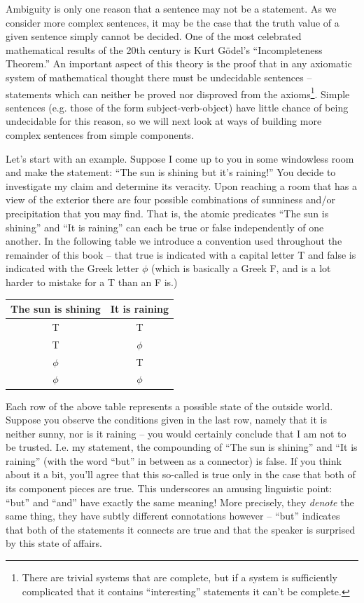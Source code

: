 Ambiguity is only one reason that a sentence may not be a statement.  As 
we consider more complex sentences, it may be the case that the truth
value of a given sentence simply cannot be decided.  One of the most
celebrated mathematical results of the 20th century is 
Kurt G\"{o}del's
``Incompleteness Theorem.''  
An important aspect of this theory is 
the proof that in any axiomatic system of mathematical thought
there must be undecidable sentences -- statements which can neither be proved
nor disproved from the axioms\footnote{There are trivial systems that %
are complete, but if a system is sufficiently complicated that it contains %
``interesting'' statements it can't be complete.}.  
Simple sentences (e.g. those of the form 
subject-verb-object) have little chance of being undecidable for this
reason, so we will next look at ways of building more complex sentences
from simple components. 

Let's start with an example.  Suppose I come up to you in some windowless
room and make the statement: ``The sun is shining but it's raining!''  
You decide to investigate my claim and determine its veracity.  Upon
reaching a room that has a view of the exterior there are four possible
combinations of sunniness and/or precipitation that you may find.  That is,
the atomic predicates ``The sun is shining'' and ``It is raining'' can each 
be true or false independently of one another.  In the following table 
we introduce a convention used throughout the remainder of this book -- 
that true is indicated with a capital letter T and false is indicated 
with the Greek letter $\phi$ (which is basically a Greek F, and is a lot harder
to mistake for a T than an F is.)

\begin{center}
\begin{tabular}{c|c}
The sun is shining \; & \; It is raining \\ \hline
T & T \\
T & $\phi$ \\
 $\phi$ & T \\
 $\phi$ &  $\phi$ \\
\end{tabular}
\end{center}

Each row of the above table represents a possible state of the outside 
world.  Suppose you observe the conditions given in the last row, namely
that it is neither sunny, nor is it raining -- you would certainly conclude
that I am not to be trusted.  I.e. my statement, the compounding of 
``The sun is shining'' and ``It is raining'' (with the word ``but'' in between
as a connector) is false.  If you think about it a bit, you'll agree that
this so-called  is true 
only in the case that both
of its component pieces are true.  This underscores an amusing linguistic
point: ``but'' and ``and'' have exactly the same meaning!  More precisely,
they {\em denote} the same thing, they have subtly different connotations
however -- ``but'' indicates that both of the statements it connects
are true and that the speaker is surprised by this state of affairs.

